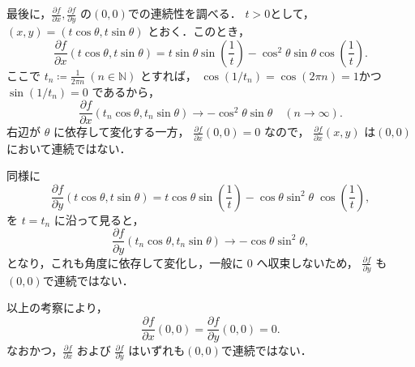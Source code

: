 \begin{tanswer}
最後に，$\frac{\partial f}{\partial x},\frac{\partial f}{\partial y}$ の$(0,0)$での連続性を調べる．
$t >0$として，$(x,y)=(t \cos \theta,t \sin \theta)$ とおく．このとき，
\[
\frac{\partial f}{\partial x}(t \cos \theta,t \sin \theta) = t\sin\theta\sin \left(\frac{1}{t}\right) - \cos^2 \theta \sin \theta \cos \left(\frac{1}{t}\right).
\]
ここで $t_n \coloneqq \frac{1}{2\pi n}~(n\in\mathbb{N})$ とすれば， $\cos(1/t_n)=\cos(2\pi n)=1$かつ$\sin(1/t_n)=0$ であるから，
\[
\frac{\partial f}{\partial x}(t_n\cos\theta,t_n\sin\theta) \longrightarrow -\cos^2\theta\sin\theta \quad (n\to\infty).
\]
右辺が $\theta$ に依存して変化する一方， $\frac{\partial f}{\partial x}(0,0)=0$ なので，
$\frac{\partial f}{\partial x}(x,y)$ は$(0,0)$において連続ではない．

同様に
\[
\frac{\partial f}{\partial y}(t \cos \theta,t \sin \theta) = t \cos \theta \sin\left(\frac{1}{t}\right) - \cos\theta\sin^2\theta\;\cos\!\left(\frac{1}{t}\right),
\]
を $t=t_n$ に沿って見ると，
\[
\frac{\partial f}{\partial y}(t_n\cos\theta,t_n\sin\theta)\longrightarrow -\cos\theta\sin^2\theta,
\]
となり，これも角度に依存して変化し，一般に $0$ へ収束しないため， $\frac{\partial f}{\partial y}$ も$(0,0)$で連続ではない．

以上の考察により，
\[
\frac{\partial f}{\partial x}(0,0)=\frac{\partial f}{\partial y}(0,0)=0.
\]
なおかつ，$\frac{\partial f}{\partial x}$ および $\frac{\partial f}{\partial y}$ はいずれも$(0,0)$で連続ではない．

\end{tanswer}






